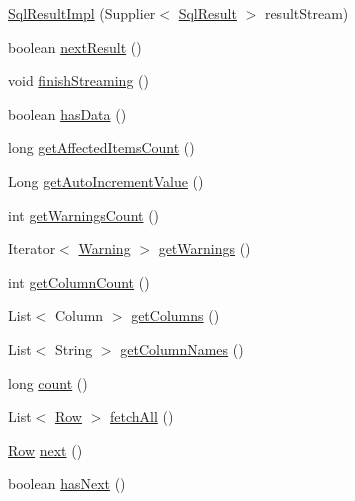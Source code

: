 \begin{DoxyCompactItemize}
\item 
\mbox{\hyperlink{classcom_1_1mysql_1_1cj_1_1xdevapi_1_1_sql_result_impl_a47ac7870d2b188ad61ff85f493aa740b}{Sql\+Result\+Impl}} (Supplier$<$ \mbox{\hyperlink{interfacecom_1_1mysql_1_1cj_1_1xdevapi_1_1_sql_result}{Sql\+Result}} $>$ result\+Stream)
\item 
boolean \mbox{\hyperlink{classcom_1_1mysql_1_1cj_1_1xdevapi_1_1_sql_result_impl_a63d1fa4f9bdb44615cb07d3324e96341}{next\+Result}} ()
\item 
void \mbox{\hyperlink{classcom_1_1mysql_1_1cj_1_1xdevapi_1_1_sql_result_impl_a9ace870266358e357a46f584b3545dc6}{finish\+Streaming}} ()
\item 
boolean \mbox{\hyperlink{classcom_1_1mysql_1_1cj_1_1xdevapi_1_1_sql_result_impl_afc10544f4b662a846d92d2889cd20335}{has\+Data}} ()
\item 
long \mbox{\hyperlink{classcom_1_1mysql_1_1cj_1_1xdevapi_1_1_sql_result_impl_a4fe6c0a9ccb9785f48c25bbeebec10e2}{get\+Affected\+Items\+Count}} ()
\item 
Long \mbox{\hyperlink{classcom_1_1mysql_1_1cj_1_1xdevapi_1_1_sql_result_impl_ac1730d1c9d94a55bd5519e803be617e4}{get\+Auto\+Increment\+Value}} ()
\item 
int \mbox{\hyperlink{classcom_1_1mysql_1_1cj_1_1xdevapi_1_1_sql_result_impl_aec69633fd00fa0b998014ea8f94cc797}{get\+Warnings\+Count}} ()
\item 
Iterator$<$ \mbox{\hyperlink{interfacecom_1_1mysql_1_1cj_1_1protocol_1_1_warning}{Warning}} $>$ \mbox{\hyperlink{classcom_1_1mysql_1_1cj_1_1xdevapi_1_1_sql_result_impl_a58d7c6a9ad8d87b5447c2d2f5849ee73}{get\+Warnings}} ()
\item 
int \mbox{\hyperlink{classcom_1_1mysql_1_1cj_1_1xdevapi_1_1_sql_result_impl_a79fa6d1b15f715dc2d451ed8ec22493f}{get\+Column\+Count}} ()
\item 
List$<$ Column $>$ \mbox{\hyperlink{classcom_1_1mysql_1_1cj_1_1xdevapi_1_1_sql_result_impl_a284f0953dcca6644eb9eff7749e32f9b}{get\+Columns}} ()
\item 
List$<$ String $>$ \mbox{\hyperlink{classcom_1_1mysql_1_1cj_1_1xdevapi_1_1_sql_result_impl_a9f539396fee9a85bbebbb39d803c9eea}{get\+Column\+Names}} ()
\item 
long \mbox{\hyperlink{classcom_1_1mysql_1_1cj_1_1xdevapi_1_1_sql_result_impl_a3b562920da1050ee09f24fb4638b7f9c}{count}} ()
\item 
List$<$ \mbox{\hyperlink{interfacecom_1_1mysql_1_1cj_1_1result_1_1_row}{Row}} $>$ \mbox{\hyperlink{classcom_1_1mysql_1_1cj_1_1xdevapi_1_1_sql_result_impl_a7d6ed19e6cf1aedeca7f530150ab0893}{fetch\+All}} ()
\item 
\mbox{\hyperlink{interfacecom_1_1mysql_1_1cj_1_1result_1_1_row}{Row}} \mbox{\hyperlink{classcom_1_1mysql_1_1cj_1_1xdevapi_1_1_sql_result_impl_a03538872432cdca74d578646e5793d3c}{next}} ()
\item 
boolean \mbox{\hyperlink{classcom_1_1mysql_1_1cj_1_1xdevapi_1_1_sql_result_impl_a6d3626107a3e51c71e4857dce6c669e2}{has\+Next}} ()
\end{DoxyCompactItemize}


